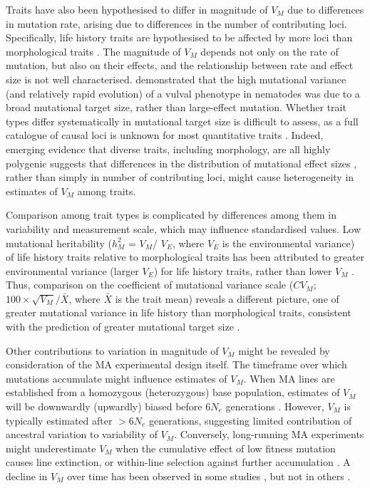 Traits have also been hypothesised to differ in magnitude of $V_M$ due to differences in mutation rate, arising due to differences in the number of contributing loci. Specifically, life history traits are hypothesised to be affected by more loci than morphological traits \citep{Houl91,Houl92a, Houl96, Houl98, Meri99}. The magnitude of $V_M$ depends not only on the rate of mutation, but also on their effects, and the relationship between rate and effect size is not well characterised. \citet{Besn20} demonstrated that the high mutational variance (and relatively rapid evolution) of a vulval phenotype in nematodes was due to a broad mutational target size, rather than large-effect mutation. Whether trait types differ systematically in mutational target size is difficult to assess, as a full catalogue of causal loci is unknown for most quantitative traits \citep{Bart02,Mack09,Yang10, Rock12}. Indeed, emerging evidence that diverse traits, including morphology, are all highly polygenic \citep{Yang10,Boyl17} suggests that differences in the distribution of mutational effect sizes \citep{Simo18}, rather than simply in number of contributing loci, might cause heterogeneity in estimates of $V_M$ among traits.\par

Comparison among trait types is complicated by differences among them in variability and measurement scale, which may influence standardised values. Low mutational heritability ($h_M^2$ = $V_M$/ $V_E$, where $V_E$ is the environmental variance) of life history traits relative to morphological traits has been attributed to greater environmental variance (larger $V_E$) for life history traits, rather than lower $V_M$ \citep{Houl96}. Thus, comparison on the coefficient of mutational variance scale ($CV_M$; $100 \times \sqrt{V_M}/\bar{X}$, where $\bar{X}$ is the trait mean) reveals a different picture, one of greater mutational variance in life history than morphological traits, consistent with the prediction of greater mutational target size \citep{Houl96}.\par

Other contributions to variation in magnitude of $V_M$ might be revealed by consideration of the MA experimental design itself. The timeframe over which mutations accumulate might influence estimates of $V_M$. When MA lines are established from a homozygous (heterozygous) base population, estimates of $V_M$ will be downwardly (upwardly) biased before $6N_e$ generations \citep{Lync86}. However, $V_M$ is typically estimated after $> 6N_e$ generations, suggesting limited contribution of ancestral variation to variability of $V_M$. Conversely, long-running MA experiments might underestimate $V_M$ when the cumulative effect of low fitness mutation causes line extinction, or within-line selection against further accumulation \citep{Lync99,Este04,McGu13}. A decline in $V_M$ over time has been observed in some studies \citep{Mack95}, but not in others \citep{Garc00,Hall08}.\par

